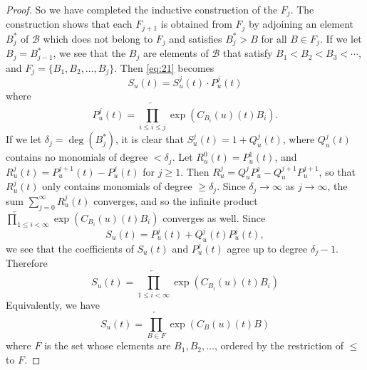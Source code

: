 \documentclass[leqno]{article}
\theoremstyle{plain}
\begin{document}
\begin{proof}
	So we have completed the inductive construction of the $F_{j}$. 
	The construction shows that each $F_{j+1}$ is obtained from $F_{j}$ by adjoining an element $B_{j}^*$ of $\mathcal{B}$ which does not belong to $F_{j}$ and satisfies $B_{j}^{*} > B$ for all $B \in F_{j}$. 
	If we let $B_{j}=B_{j-1}^{*}$, we see that the $B_{j}$ are elements of $\mathcal{B}$ that satisfy $B_{1}<B_{2}<B_3<\dotsb$, and $F_j = \{ B_1, B_2, \dotsc, B_j \}$.
	Then \eqref{eq:21} becomes
	\begin{equation}
		S_{u}(t)=S_{u}^{j}(t) \cdot P_{u}^{j}(t)
	\end{equation}
	where
	\begin{equation}
		P_{u}^{j}(t)= \overleftarrow{\prod_{i \leq i \leq j}} \exp \left(C_{B_{i}}(u)(t) B_{i}\right).
	\end{equation}
	If we let $\delta_{j}=\operatorname{deg}\left(B_{j}^{*}\right)$, it is clear that $S_{u}^{j}(t)=1+Q_{u}^{j}(t)$, where $Q_{u}^{j}(t)$ contains no monomials of degree $<\delta_{j}$. Let $R_{u}^{0}(t)=P_{u}^{1}(t)$, and $R_{u}^{j}(t)=P_{u}^{j+1}(t)-P_{u}^{j}(t)$ for $j \geq 1$. Then $R_{u}^{j}=Q_{u}^{j} P_{u}^{j}-Q_{u}^{j+1} P_{u}^{j+1}$, so that $R_{u}^{j}(t)$ only contains monomials of degree $\geq \delta_{j}$. Since $\delta_{j} \rightarrow \infty$ as $j \rightarrow \infty$, the sum $\sum_{j=0}^{\infty} R_{u}^{j}(t)$ converges, and so the infinite product $\overleftarrow{\prod}_{1\leq i<\infty} \exp \left(C_{B_{i}}(u)(t) B_{i}\right)$ converges as well. Since
	\begin{equation}
		S_{u}(t)=P_{u}^{j}(t)+Q_{u}^{j}(t) P_{u}^{j}(t),
	\end{equation}
	we see that the coefficients of $S_{u}(t)$ and $P_{u}^{j}(t)$ agree up to degree $\delta_{j}-1$. Therefore
	\begin{equation}
		S_{u}(t)= \overleftarrow{\prod_{1 \leq i<\infty}} \exp \left(C_{B_{i}}(u)(t) B_{i}\right)
	\end{equation}
	Equivalently, we have
	\begin{equation} \label{eq:35}
		S_{u}(t)= \overleftarrow{\prod_{B \in F}} \exp \left(C_{B}(u)(t) B\right)
	\end{equation}
	where $F$ is the set whose elements are $B_{1}, B_{2}, \ldots$, ordered by the restriction of $\leq$ to $F$.	
	

\end{proof}
\end{document}
